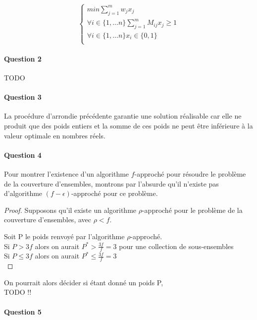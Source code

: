 \documentclass[a4paper, 12pt]{article}
\begin{document}
\begin{equation}
\begin{cases}
min \sum_{j=1}^m w_j x_j\\
\forall i \in \{1, \dots n \} \sum_{j=1}^{m} M_{ij}x_{j} \geq 1 \\
\forall i \in \{1, \dots n\} x_i \in \{0,1\} \\
\end{cases}
\end{equation}
\paragraph{Question 2}

TODO

\paragraph{Question 3}

La procédure d'arrondie précédente garantie une solution réalisable
car elle ne produit que des poids entiers et la somme de ces poids ne
peut être inférieure à la valeur optimale en nombres réels.

\paragraph{Question 4}

Pour montrer l'existence d'un algorithme $f$-approché pour résoudre le
problème de la couverture d'ensembles, montrons par l'absurde qu'il
n'existe pas d'algorithme $(f - \epsilon)$-approché pour ce problème.
\begin{proof}
Supposons qu'il existe un algorithme $\rho$-approché pour le problème
de la couverture d'ensembles, avec $\rho<f$. 

Soit P le poids renvoyé par l'algorithme $\rho$-approché. \\
Si $P > 3f$ alors on aurait $P^* > \frac{3f}{f} = 3 $ pour une
collection de sous-ensembles\\
Si $P \leq 3f$ alors on aurait $P^* \leq \frac{3f}{f} = 3 $ \\
\end{proof}
On pourrait alors décider si étant donné un poids P, \\
TODO !!

\paragraph{Question 5}
\end{document}
